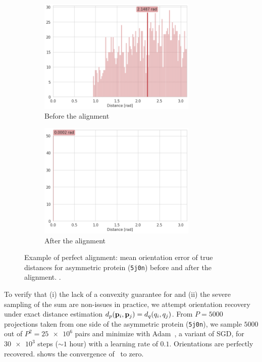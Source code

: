 \begin{figure}[!]
    \centering
    \begin{subfigure}[b]{0.45\textwidth}
        \includegraphics[height=5.5cm]{images/5j0n_perfect_angle_ralignment_before.png}
        \caption{Before the alignment}
    \end{subfigure}
    \hfill
    \begin{subfigure}[b]{0.5\textwidth}
    \centering
        \includegraphics[height=5.5cm]{images/5j0n_perfect_angle_ralignment_after.png}
        \caption{After the alignment}
    \end{subfigure}
    \caption{Example of perfect alignment: mean orientation error of true distances for asymmetric protein (\texttt{5j0n}) before and after the alignment.
        .
    }
    \label{fig:angle-alignment-perfect}
\end{figure}


To verify that (i) the lack of a convexity guarantee for  and (ii) the severe sampling of the sum are non-issues in practice, we attempt orientation recovery under exact distance estimation $d_p(\mathbf{p}_i, \mathbf{p}_j) = d_q(q_i, q_j)$.
From $P=5000$ projections taken from one side of the asymmetric protein (\texttt{5j0n}), we sample $5000$ out of $P^2 = \num{25e6}$ pairs and minimize  with Adam~\cite{kingma2014adam}, a variant of SGD, for $\num{30e3}$ steps ($\sim 1$ hour) with a learning rate of $0.1$.
Orientations are perfectly recovered.
 shows the convergence of~ to zero.

